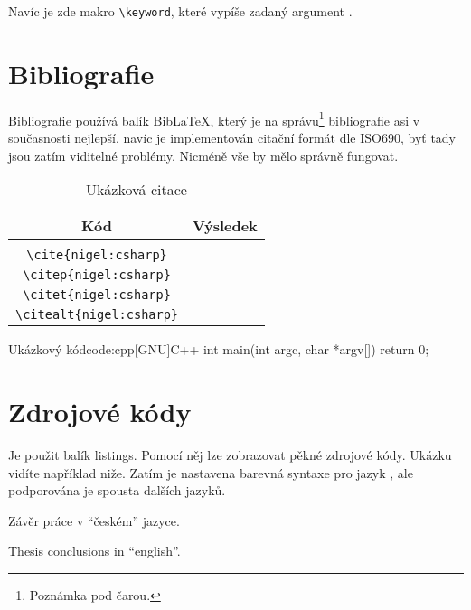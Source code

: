 \documentclass[a4paper,12pt]{article}
\begin{document}
Navíc je zde makro \verb|\keyword|, které vypíše zadaný argument .

\section{Bibliografie}
Bibliografie používá balík Bib\LaTeX, který je na správu\footnote{Poznámka pod čarou.} bibliografie asi v současnosti nejlepší, navíc je implementován citační formát dle ISO690, byť tady jsou zatím viditelné problémy. Nicméně vše by mělo správně fungovat.

\begin{table}
\caption{Ukázková citace}
\begin{center}
\begin{tabular}{c|l}
Kód & Výsledek \\
\hline \\
\verb|\cite{nigel:csharp}| & \cite{nigel:csharp} \\
\verb|\citep{nigel:csharp}| & \citep{nigel:csharp} \\
\verb|\citet{nigel:csharp}| & \citet{nigel:csharp} \\
\verb|\citealt{nigel:csharp}| & \citealt{nigel:csharp}
\end{tabular}
\end{center}
\end{table}

\begin{upcode}{Ukázkový \cpp kód}{code:cpp}{[GNU]C++}
int main(int argc, char *argv[]) {
	return 0;
}
\end{upcode}

\section{Zdrojové kódy}
Je použit balík listings. Pomocí něj lze zobrazovat pěkné zdrojové kódy. Ukázku vidíte například niže. Zatím je nastavena barevná syntaxe pro jazyk \cpp, ale podporována je spousta dalších jazyků.


\begin{upconclusions}[czech]
Závěr práce v \enquote{českém} jazyce.
\end{upconclusions}

\begin{upconclusions}[english]
Thesis conclusions in \enquote{english}.
\end{upconclusions}
\end{document}
